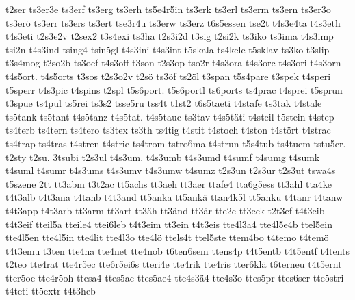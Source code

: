 {    t2ser
    ts3er3e
    ts3erf
    ts3erg
    ts3erh
    ts5e4r5in
    ts3erk
    ts3erl
    ts3erm
    ts3ern
    ts3er3o
    ts3erö
    ts3err
    ts3ers
    ts3ert
    tse3r4u
    ts3erw
    ts3erz
    t6s5essen
    tse2t
    t4s3e4ta
    t4s3eth
    t4s3eti
    t2s3e2v
    t2sex2
    t3s4exi
    ts3ha
    t2s3i2d
    t3sig
    t2si2k
    ts3iko
    ts3ima
    t4s3imp
    tsi2n
    t4s3ind
    tsing4
    tsin5gl
    t4s3ini
    t4s3int
    t5skala
    ts4kele
    t5sklav
    ts3ko
    t3slip
    t3s4mog
    t2so2b
    ts3oef
    t4s3off
    t3son
    t2s3op
    tso2r
    t4s3ora
    t4s3orc
    t4s3ori
    t4s3orn
    t4s5ort.
    t4s5orts
    t3sos
    t2s3o2v
    t2sö
    ts3öf
    ts2öl
    t3span
    t5s4pare
    t3spek
    t4speri
    t5sperr
    t4s3pic
    t4spins
    t2spl
    t5s6port.
    t5s6portl
    ts6ports
    ts4prac
    t4sprei
    t5sprun
    t3spue
    ts4pul
    ts5rei
    ts3s2
    tsse5ru
    tss4t
    t1st2
    t6s5taeti
    t4stafe
    ts3tak
    t4stale
    ts5tank
    ts5tant
    t4s5tanz
    t4s5tat.
    t4s5tauc
    ts3tav
    t4s5täti
    t4steil
    t5stein
    t4step
    ts4terb
    ts4tern
    ts4tero
    ts3tex
    ts3th
    ts4tig
    t4stit
    t4stoch
    t4ston
    t4stört
    t4strac
    ts4trap
    ts4tras
    t4stren
    t4strie
    ts4trom
    tstro6ma
    t4strun
    t5s4tub
    ts4tuem
    tstu5er.
    t2sty
    t2su.
    3tsubi
    t2s3ul
    t4s3um.
    t4s3umb
    t4s3umd
    t4sumf
    t4sumg
    t4sumk
    t4suml
    t4sumr
    t4s3ums
    t4s3umv
    t4s3umw
    t4sumz
    t2s3un
    t2s3ur
    t2s3ut
    tswa4s
    t5szene
    2tt
    tt3abm
    t3t2ac
    tt5achs
    tt3aeh
    tt3aer
    ttafe4
    tta6g5ess
    tt3ahl
    tta4ke
    t4t3alb
    t4t3ana
    t4tanb
    t4t3and
    tt5anka
    tt5ankä
    ttan4k5l
    tt5anku
    t4tanr
    t4tanw
    t4t3app
    t4t3arb
    tt3arm
    tt3art
    tt3äh
    tt3änd
    tt3är
    tte2c
    tt3eck
    t2t3ef
    t4t3eib
    t4t3eif
    tteil5a
    tteile4
    ttei6leb
    t4t3eim
    tt3ein
    t4t3eis
    tte4l3a4
    tte4l5e4b
    ttel5ein
    tte4l5en
    tte4l5in
    tte4lit
    tte4l3o
    tte4lö
    ttels4t
    ttel5ste
    ttem4bo
    t4temo
    t4temö
    t4t3emu
    t3ten
    tte4na
    tte4net
    tte4nob
    t6ten6sem
    ttens4p
    t4t5entb
    t4t5entf
    t4tents
    t2teo
    tte4rat
    tte4r5ec
    tte6r5ei6s
    tteri4e
    tte4rik
    tte4ris
    tter6klä
    t6terneu
    t4t5ernt
    tter5oe
    tte4r5oh
    ttesa4
    ttes5ac
    ttes5ae4
    tte4s3ä4
    tte4s3o
    ttes5pr
    ttes6ser
    tte5stri
    t4teti
    tt5extr
    t4t3heb
}
